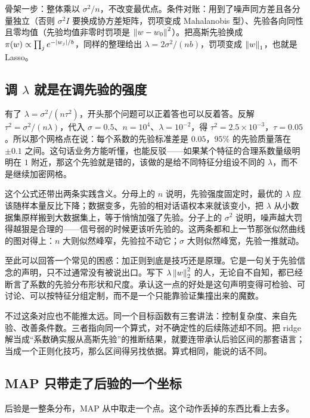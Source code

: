 骨架一步：整体乘以 \(\sigma^2/n\)，不改变最优点。条件对账：用到了噪声同方差且各分量独立（否则 \(\sigma^2 I\) 要换成协方差矩阵，罚项变成 Mahalanobis 型）、先验各向同性且零均值（先验均值非零时罚项是 \(\left\lVert w-w_0\right\rVert^2\)）。把高斯先验换成 \(\pi(w)\propto\prod_j e^{-\left|w_j\right|/b}\)，同样的整理给出 \(\lambda=2\sigma^2/(nb)\)，罚项变成 \(\left\lVert w\right\rVert_1\)，也就是 Lasso。

\subsection{调 \texorpdfstring{\(\lambda\)}{lambda} 就是在调先验的强度}

有了 \(\lambda=\sigma^2/(n\tau^2)\)，开头那个问题可以正着答也可以反着答。反解 \(\tau^2=\sigma^2/(n\lambda)\)，代入 \(\sigma=0.5\)、\(n=10^4\)、\(\lambda=10^{-2}\)，得 \(\tau^2=2.5\times 10^{-3}\)，\(\tau=0.05\)。所以那个网格点在说：每个系数的先验标准差是 \(0.05\)，\(95\%\) 的先验质量落在 \(\pm 0.1\) 之间。这句话业务方能听懂，也能反驳——如果某个特征的合理系数量级明明在 \(1\) 附近，那这个先验就是错的，该做的是给不同特征分组设不同的 \(\lambda\)，而不是继续加密网格。

这个公式还带出两条实践含义。分母上的 \(n\) 说明，先验强度固定时，最优的 \(\lambda\) 应该随样本量反比下降；数据变多，先验的相对话语权本来就该变小，把 \(\lambda\) 从小数据集原样搬到大数据集上，等于悄悄加强了先验。分子上的 \(\sigma^2\) 说明，噪声越大罚得越狠是合理的——信号弱的时候更该听先验的。这两条都和上一节那张似然曲线的图对得上：\(n\) 大则似然峰窄，先验拉不动它；\(\sigma\) 大则似然峰宽，先验一推就动。

至此可以回答一个常见的困惑：加正则到底是技巧还是原理。它是一句关于先验信念的声明，只不过通常没有被说出口。写下 \(\lambda\left\lVert w\right\rVert_2^2\) 的人，无论自不自知，都已经断言了系数的先验分布形状和尺度。承认这一点的好处是这句声明变得可检验、可讨论、可以按特征分组定制，而不是一个只能靠验证集撞出来的魔数。

不过这条对应也不能推太远。同一个目标函数有三套讲法：控制复杂度、来自先验、改善条件数。三者指向同一个算式，对不确定性的后续陈述却不同。把 ridge 解当成``系数确实服从高斯先验''的推断结果，就要连带承认后验区间的那套语言；当成一个正则化技巧，那么区间得另找依据。算式相同，能说的话不同。

\subsection{MAP 只带走了后验的一个坐标}

后验是一整条分布，MAP 从中取走一个点。这个动作丢掉的东西比看上去多。

